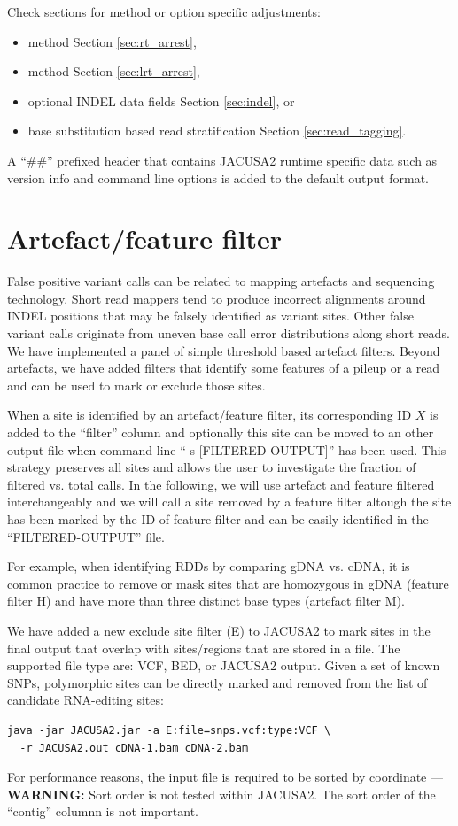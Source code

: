 \documentclass[10pt,a4paper,final]{article}
\begin{document}
Check sections for method or option specific adjustments:
\begin{itemize}
  \item \rtarrest method Section \ref{sec:rt_arrest},
  \item \lrtarrest method Section \ref{sec:lrt_arrest},
  \item optional INDEL data fields Section \ref{sec:indel}, or
  \item base substitution based read stratification Section \ref{sec:read_tagging}.
\end{itemize}

A ``\#\#'' prefixed header that contains JACUSA2 runtime specific data such as version info and
command line options is added to the default output format.
\section{Artefact/feature filter}\label{sec:artefact_filter}
False positive variant calls can be related to mapping artefacts and sequencing technology.
Short read mappers tend to produce incorrect alignments around INDEL positions that may be falsely 
identified as variant sites.
Other false variant calls originate from uneven base call error distributions along short reads.
We have implemented a panel of simple threshold based artefact filters. Beyond artefacts, we have 
added filters that identify some features of a pileup or a read and can be used to mark or exclude 
those sites.

When a site is identified by an artefact/feature filter, its corresponding ID $X$ is added to the
``filter'' column and optionally this site can be moved to an other output file when command
line ``-s [FILTERED-OUTPUT]'' has been used. This strategy preserves all sites and allows the user
to investigate the fraction of filtered vs. total calls. In the following, we will use artefact and
feature filtered interchangeably and we will call a site removed by a feature filter altough the site
has been marked by the ID of feature filter and can be easily identified in the ``FILTERED-OUTPUT'' file.

For example, when identifying RDDs by comparing gDNA vs. cDNA, it is common practice to remove or
mask sites that are homozygous in gDNA (feature filter H) and have more than three distinct base
types (artefact filter M).

We have added a new exclude site filter (E) to JACUSA2 to mark sites in the final output that overlap 
with sites/regions that are stored in a file. The supported file type are: VCF, BED, 
or JACUSA2 output. Given a set of known SNPs, polymorphic sites can be directly marked and removed 
from the list of candidate RNA-editing sites:
\begin{verbatim}
java -jar JACUSA2.jar -a E:file=snps.vcf:type:VCF \
  -r JACUSA2.out cDNA-1.bam cDNA-2.bam
\end{verbatim}
For performance reasons, the input file is required to be sorted by coordinate --- \textbf{WARNING:} 
Sort order is not tested within JACUSA2. The sort order of the ``contig'' columnn is not important.
\end{document}

